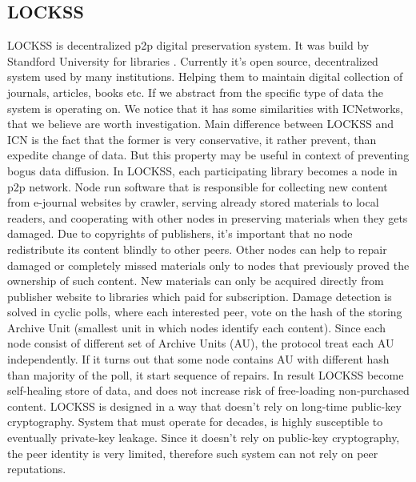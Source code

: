 \documentclass[nostrict]{szablonPG}
\begin{document}
\subsection{LOCKSS}
LOCKSS is decentralized p2p digital preservation system. It was build by Standford University for libraries \cite{maniatis2003preserving}. Currently it's open source, decentralized system used by many institutions. Helping them to maintain digital collection of journals, articles, books etc. If we abstract from the specific type of data the system is operating on. We notice that it has some similarities with ICNetworks, that we believe are worth investigation. Main difference between LOCKSS and ICN is the fact that the former is very conservative, it rather prevent, than expedite change of data. But this property may be useful in context of preventing bogus data diffusion. 
In LOCKSS, each participating library becomes a node in p2p network. Node run software that is responsible for collecting new content from e-journal websites by crawler, serving already stored materials to local readers, and cooperating with other nodes in preserving materials when they gets damaged. 
Due to copyrights of publishers, it's important that no node redistribute its content blindly to other peers. Other nodes can help to repair damaged or completely missed materials only to nodes that previously proved the ownership of such content. New materials can only be acquired directly from publisher website to libraries which paid for subscription. 
Damage detection is solved in cyclic polls, where each interested peer, vote on the hash of the storing Archive Unit (smallest unit in which nodes identify each content). Since each node consist of different set of Archive Units (AU), the protocol treat each AU independently. If it turns out that some node contains AU with different hash than majority of the poll, it start sequence of repairs. In result LOCKSS become self-healing store of data, and does not increase risk of free-loading non-purchased content.
LOCKSS is designed in a way that doesn't rely on long-time public-key cryptography. System that must operate for decades, is highly susceptible to eventually private-key leakage. Since it doesn't rely on public-key cryptography, the peer identity is very limited, therefore such system can not rely on peer reputations.
\end{document}
